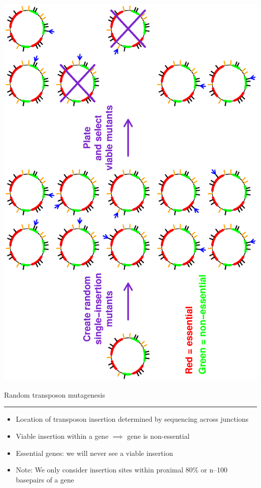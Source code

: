 \documentclass[12pt]{article}
\newcommand{\headsize}{\fontsize{35}{35} \selectfont}
\newcommand{\textsize}{\fontsize{30}{35} \selectfont}
\newcommand{\headcolor}{\color [cmyk]{0.72,0.67,0.33,0}}
\newcommand{\linecolor}{\color [named]{Thistle}}
\begin{document}
\vspace{-15mm}
\centerline{\includegraphics[angle=270]{Figs/mut6.ps}}



\newpage

\headsize \headcolor
\centerline{Random transposon mutagenesis}
\linecolor \noindent \rule[3mm]{10in}{2mm}

\vspace{5mm}
\normalcolor \textsize 

\hfill
\begin{minipage}[t]{9.5in} \begin{itemize}
\setlength{\rightskip}{0pt plus 1fil} %
\setlength{\itemsep}{15pt}

\item Location of transposon insertion determined by sequencing across
junctions

\item Viable insertion within a gene $\implies$ gene is non-essential 

\item Essential genes: we will never see a viable insertion

\item Note: We only consider insertion sites within proximal 80\% or
n--100 basepairs of a gene

\end{itemize}
\end{minipage}
\end{document}
